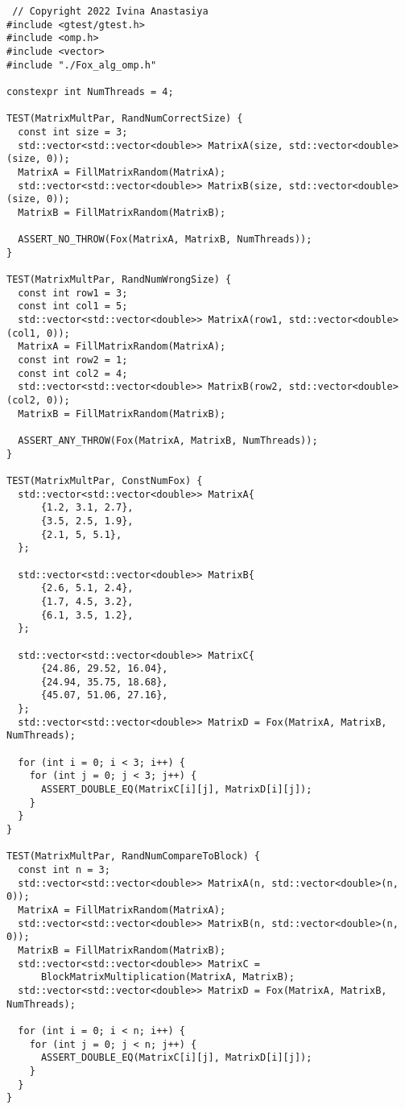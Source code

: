 \documentclass{report}
\begin{document}
 \begin{lstlisting}
 // Copyright 2022 Ivina Anastasiya
#include <gtest/gtest.h>
#include <omp.h>
#include <vector>
#include "./Fox_alg_omp.h"

constexpr int NumThreads = 4;

TEST(MatrixMultPar, RandNumCorrectSize) {
  const int size = 3;
  std::vector<std::vector<double>> MatrixA(size, std::vector<double>(size, 0));
  MatrixA = FillMatrixRandom(MatrixA);
  std::vector<std::vector<double>> MatrixB(size, std::vector<double>(size, 0));
  MatrixB = FillMatrixRandom(MatrixB);

  ASSERT_NO_THROW(Fox(MatrixA, MatrixB, NumThreads));
}

TEST(MatrixMultPar, RandNumWrongSize) {
  const int row1 = 3;
  const int col1 = 5;
  std::vector<std::vector<double>> MatrixA(row1, std::vector<double>(col1, 0));
  MatrixA = FillMatrixRandom(MatrixA);
  const int row2 = 1;
  const int col2 = 4;
  std::vector<std::vector<double>> MatrixB(row2, std::vector<double>(col2, 0));
  MatrixB = FillMatrixRandom(MatrixB);

  ASSERT_ANY_THROW(Fox(MatrixA, MatrixB, NumThreads));
}

TEST(MatrixMultPar, ConstNumFox) {
  std::vector<std::vector<double>> MatrixA{
      {1.2, 3.1, 2.7},
      {3.5, 2.5, 1.9},
      {2.1, 5, 5.1},
  };

  std::vector<std::vector<double>> MatrixB{
      {2.6, 5.1, 2.4},
      {1.7, 4.5, 3.2},
      {6.1, 3.5, 1.2},
  };

  std::vector<std::vector<double>> MatrixC{
      {24.86, 29.52, 16.04},
      {24.94, 35.75, 18.68},
      {45.07, 51.06, 27.16},
  };
  std::vector<std::vector<double>> MatrixD = Fox(MatrixA, MatrixB, NumThreads);

  for (int i = 0; i < 3; i++) {
    for (int j = 0; j < 3; j++) {
      ASSERT_DOUBLE_EQ(MatrixC[i][j], MatrixD[i][j]);
    }
  }
}

TEST(MatrixMultPar, RandNumCompareToBlock) {
  const int n = 3;
  std::vector<std::vector<double>> MatrixA(n, std::vector<double>(n, 0));
  MatrixA = FillMatrixRandom(MatrixA);
  std::vector<std::vector<double>> MatrixB(n, std::vector<double>(n, 0));
  MatrixB = FillMatrixRandom(MatrixB);
  std::vector<std::vector<double>> MatrixC =
      BlockMatrixMultiplication(MatrixA, MatrixB);
  std::vector<std::vector<double>> MatrixD = Fox(MatrixA, MatrixB, NumThreads);

  for (int i = 0; i < n; i++) {
    for (int j = 0; j < n; j++) {
      ASSERT_DOUBLE_EQ(MatrixC[i][j], MatrixD[i][j]);
    }
  }
}


\end{lstlisting}
\end{document}
